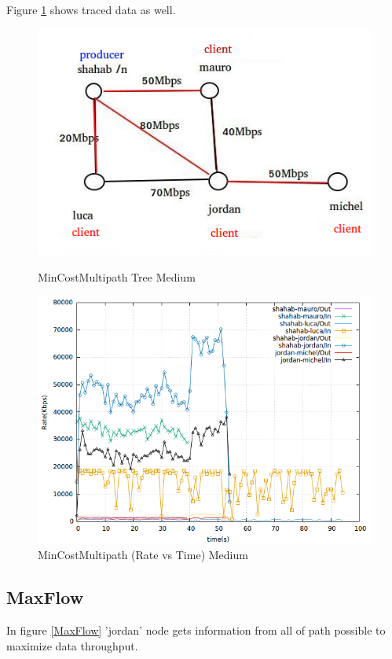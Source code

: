 Figure \ref{mincost} shows traced data as well.
\begin{figure}[H]

\begin{center}

\includegraphics[scale = 0.4]{Figures/MinCostMultipath.png}

\caption{MinCostMultipath Tree Medium} \label{MinCostMultipath} 

\includegraphics[scale = 0.4]{Figures/mincostmultipath.png}
\caption{MinCostMultipath (Rate vs Time) Medium} \label{mincost} 

\end{center}

\end{figure}

\subsection{MaxFlow}
In figure \ref{MaxFlow} 'jordan' node gets information from all of path possible to maximize data throughput.

